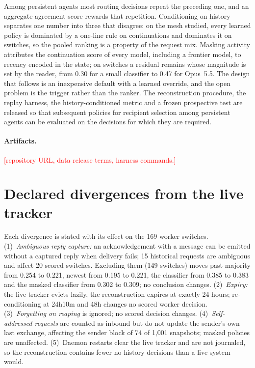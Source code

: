 \documentclass[11pt]{article}
\theoremstyle{definition}
\newcommand{\todo}[1]{\textcolor{red}{[#1]}}
\begin{document}
Among persistent agents most routing decisions repeat the preceding one, and an aggregate agreement score rewards that repetition. Conditioning on history separates one number into three that disagree: on the mesh studied, every learned policy is dominated by a one-line rule on continuations and dominates it on switches, so the pooled ranking is a property of the request mix. Masking activity attributes the continuation score of every model, including a frontier model, to recency encoded in the state; on switches a residual remains whose magnitude is set by the reader, from 0.30 for a small classifier to 0.47 for Opus~5.5. The design that follows is an inexpensive default with a learned override, and the open problem is the trigger rather than the ranker. The reconstruction procedure, the replay harness, the history-conditioned metric and a frozen prospective test are released so that subsequent policies for recipient selection among persistent agents can be evaluated on the decisions for which they are required.

\paragraph{Artifacts.}
\todo{repository URL, data release terms, harness commands.}




\appendix

\section{Declared divergences from the live tracker}
\label{app:divergences}

Each divergence is stated with its effect on the 169 worker switches. (1)~\emph{Ambiguous reply capture:} an acknowledgement with a message can be emitted without a captured reply when delivery fails; 15 historical requests are ambiguous and affect 20 scored switches. Excluding them (149 switches) moves past majority from 0.254 to 0.221, newest from 0.195 to 0.221, the classifier from 0.385 to 0.383 and the masked classifier from 0.302 to 0.309; no conclusion changes. (2)~\emph{Expiry:} the live tracker evicts lazily, the reconstruction expires at exactly 24 hours; re-conditioning at 24h10m and 48h changes no scored worker decision. (3)~\emph{Forgetting on reaping} is ignored; no scored decision changes. (4)~\emph{Self-addressed requests} are counted as inbound but do not update the sender's own last exchange, affecting the sender block of 74 of 1,001 snapshots; masked policies are unaffected. (5)~Daemon restarts clear the live tracker and are not journaled, so the reconstruction contains fewer no-history decisions than a live system would.
\end{document}
